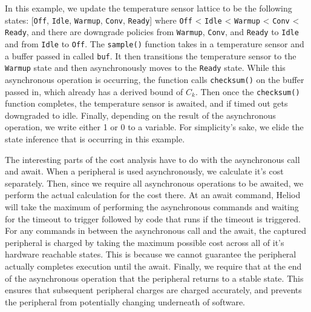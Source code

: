 In this example, we update the temperature sensor lattice to be the following states: [\texttt{Off}, \texttt{Idle}, \texttt{Warmup}, \texttt{Conv}, \texttt{Ready}] where \texttt{Off} < \texttt{Idle} < \texttt{Warmup} < \texttt{Conv} < \texttt{Ready}, and there are downgrade policies from \texttt{Warmup}, \texttt{Conv}, and \texttt{Ready} to \texttt{Idle} and from \texttt{Idle} to \texttt{Off}. The \texttt{sample()} function takes in a temperature sensor and a buffer passed in called \texttt{buf}. It then transitions the temperature sensor to the \texttt{Warmup} state and then asynchronously moves to the \texttt{Ready} state. While this asynchronous operation is occurring, the function calls \texttt{checksum()} on the buffer passed in, which already has a derived bound of $C_k$. Then once the \texttt{checksum()} function completes, the temperature sensor is awaited, and if timed out gets downgraded to idle. Finally, depending on the result of the asynchronous operation, we write either 1 or 0 to a variable. For simplicity's sake, we elide the state inference that is occurring in this example. 

The interesting parts of the cost analysis have to do with the asynchronous call and await. When a peripheral is used asynchronously, we calculate it's cost separately. Then, since we require all asynchronous operations to be awaited, we perform the actual calculation for the cost there. At an await command, Heliod will take the maximum of performing the asynchronous commands and waiting for the timeout to trigger followed by code that runs if the timeout is triggered. For any commands in between the asynchronous call and the await, the captured peripheral is charged by taking the maximum possible cost across all of it's hardware reachable states. This is because we cannot guarantee the peripheral actually completes execution until the await. Finally, we require that at the end of the asynchronous operation that the peripheral returns to a stable state. This ensures that subsequent peripheral charges are charged accurately, and prevents the peripheral from potentially changing underneath of software. 